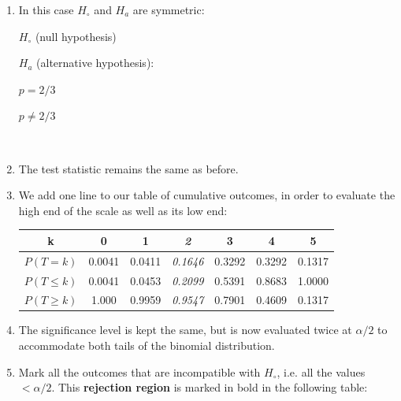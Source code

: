 \begin{enumerate}

\item In this case $H_\circ$ and $H_a$ are symmetric:\\

\noindent\begin{minipage}{.4\textwidth}
  $H_\circ$ (null hypothesis)
  
  \vspace{1em}
  
  $H_a$ (alternative hypothesis):
\end{minipage}
\begin{minipage}{.2\textwidth}
\end{minipage}
\begin{minipage}{.2\textwidth}
  $p=2/3$
  
  \vspace{1em}
  
  ${p}\neq{2/3}$
\end{minipage}
\begin{minipage}{.2\textwidth}
\end{minipage}\\

\item The test statistic remains the same as before.

\item We add one line to our table of cumulative outcomes, in order to
  evaluate the high end of the scale as well as its low end:

  \begin{center}
    \begin{tabular}{ccccccc}
      k & 0 & 1 & \textit{2} & 3 & 4 & 5 \\ \hline
      $P(T=k)$ & 0.0041 & 0.0411 & \textit{0.1646} & 0.3292 & 0.3292 & 0.1317 \\
      $P({T}\leq{k})$ & 0.0041 & 0.0453 & \textit{0.2099} &
      0.5391 & 0.8683 & 1.0000 \\
      $P({T}\geq{k})$ & 1.000 & 0.9959 & \textit{0.9547} &
      0.7901 & 0.4609 & 0.1317
    \end{tabular}
  \end{center}
  
\item The significance level is kept the same, but is now evaluated
  twice at $\alpha/2$ to accommodate both tails of the binomial
  distribution.

\item Mark all the outcomes that are incompatible with $H_\circ$,
  i.e. all the values $<\alpha/2$.  This \textbf{rejection region} is
  marked in bold in the following table:


\end{enumerate}
